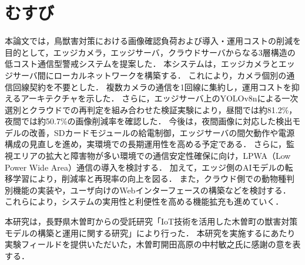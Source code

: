 \documentclass[technicalreport]{ieicej}
\begin{document}
\section{むすび}
本論文では，鳥獣害対策における画像確認負荷および導入・運用コストの削減を目的として，エッジカメラ，エッジサーバ，クラウドサーバからなる3層構造の低コスト通信型警戒システムを提案した．
本システムは，エッジカメラとエッジサーバ間にローカルネットワークを構築する．
これにより，カメラ個別の通信回線契約を不要とした．
複数カメラの通信を1回線に集約し，運用コストを抑えるアーキテクチャを示した．
さらに，エッジサーバ上のYOLOv8nによる一次選別とクラウドでの再判定を組み合わせた検証実験により，昼間では約81.2\%，夜間では約50.7\%の画像削減率を確認した．
今後は，夜間画像に対応した検出モデルの改善，SDカードモジュールの給電制御，エッジサーバの間欠動作や電源構成の見直しを進め，実環境での長期運用性を高める予定である．
さらに，監視エリアの拡大と障害物が多い環境での通信安定性確保に向け，LPWA（Low Power Wide Area）通信の導入を検討する．
加えて，エッジ側のAIモデルの転移学習により，削減率と再現率の向上を図る．
また，クラウド側での動物種判別機能の実装や，ユーザ向けのWebインターフェースの構築などを検討する．
これらにより，システムの実用性と利便性を高める機能拡充も進めていく．

\ack
本研究は，長野県木曽町からの受託研究「IoT技術を活用した木曽町の獣害対策モデルの構築と運用に関する研究」により行った．
本研究を実施するにあたり実験フィールドを提供いただいた，木曽町開田高原の中村敏之氏に感謝の意を表する．






\begin{biography}
\end{biography}
\end{document}
